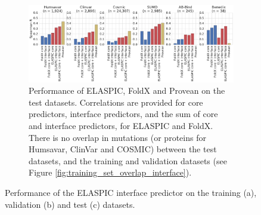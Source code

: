 \begin{figure}[tb]
\begin{subfigure}[b]{1.0\textwidth}
{		}
		\label{fig:validation_performance_interface}
		\vspace*{10mm}
	\end{subfigure}
	\begin{subfigure}[b]{1.0\textwidth}
		\centering
		\includegraphics[width=1.0\textwidth]{static/elaspic_training_set/validation/test_performance_interface.pdf}
		\caption{
			Performance of ELASPIC, FoldX and Provean on the test datasets.
			Correlations are provided for core predictors, interface predictors, and the sum of core and interface predictors, for ELASPIC and FoldX.
			There is no overlap in mutations (or proteins for Humsavar, ClinVar and COSMIC) between the test datasets,
			and the training and validation datasets (see Figure \ref{fig:training_set_overlap_interface}).
		}
		\label{fig:test_performance_interface}
		\vspace*{5mm}
	\end{subfigure}
	\caption[Interface predictor validation.]{Performance of the ELASPIC interface predictor on the training (a), validation (b) and test (c) datasets.}
	\label{fig:interface_validation}
\end{figure}

